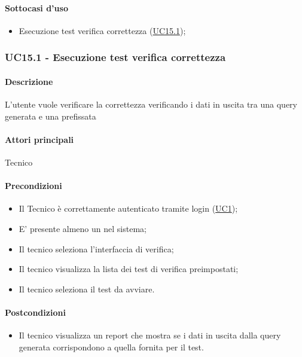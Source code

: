 \paragraph*{Sottocasi d'uso}
\begin{itemize}
  \item Esecuzione test verifica correttezza (\hyperref[UC15point1]{UC15.1});
\end{itemize}


\subsubsection{UC15.1 - Esecuzione test verifica correttezza}\label{UC15point1}
\paragraph*{Descrizione}
L’utente vuole verificare la correttezza verificando i dati in uscita tra una query generata e una prefissata

\paragraph*{Attori principali}
Tecnico

\paragraph*{Precondizioni}
\begin{itemize}
  \item Il Tecnico è correttamente autenticato tramite login (\hyperref[UC1]{UC1});
  \item E’ presente almeno un nel sistema;
  \item Il tecnico seleziona l’interfaccia di verifica;
  \item Il tecnico visualizza la lista dei test di verifica preimpostati;
  \item Il tecnico seleziona il test da avviare.
\end{itemize}

\paragraph*{Postcondizioni}
\begin{itemize}
  \item Il tecnico visualizza un report che mostra se i dati in uscita dalla query generata corrispondono a quella fornita per il test.
\end{itemize}


